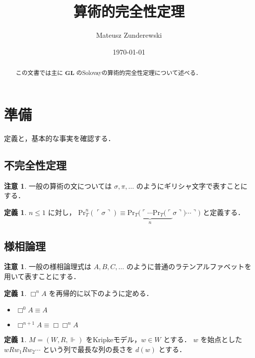 \documentclass{jsarticle}
\title{算術的完全性定理}
\author{Mateusz Zunderewski}
\date{\today}
\newcommand*{\Logic}[1]{\mathbf{#1}}
\newcommand*{\LogicGL}{\Logic{GL}}
\newcommand*{\Provable}{\mathrm{Pr}}
\theoremstyle{definition}
\newtheorem{definition}[theorem]{定義}
\newtheorem{remark}[theorem]{注意}
\begin{document}
\maketitle

\begin{abstract}
    この文書では主に $\LogicGL$ のSolovayの算術的完全性定理について述べる．
\end{abstract}

\section{準備}

定義と，基本的な事実を確認する．

\subsection{不完全性定理}

\begin{remark}
    一般の算術の文については $\sigma, \pi, \dots$ のようにギリシャ文字で表すことにする．
\end{remark}

\begin{definition}
    $n \leq 1$ に対し，
    $\Provable_T^n(\ulcorner \sigma \urcorner) \equiv \underbrace{\Provable_T(\ulcorner \cdots \Provable_T(\ulcorner}_{n} \sigma \urcorner) \cdots \urcorner)$ と定義する．
\end{definition}


\subsection{様相論理}

\begin{remark}
    一般の様相論理式は $A,B,C,\dots$ のように普通のラテンアルファベットを用いて表すことにする．
\end{remark}

\begin{definition}
    $\Box^n A$ を再帰的に以下のように定める．
    \begin{itemize}
        \item $\Box^0 A \equiv A$
        \item $\Box^{n+1} A \equiv \Box \Box^n A$
    \end{itemize}
\end{definition}


\begin{definition}
    $M = (W, R, \Vdash)$ をKripkeモデル，$w \in W$ とする．
    $w$ を始点とした $w R w_1 R w_2 \cdots$ という列で最長な列の長さを $d(w)$ とする．
\end{definition}
\end{document}
